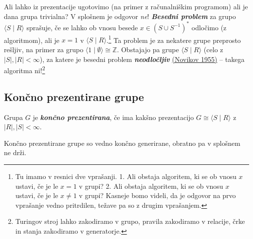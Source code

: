 \documentclass[11pt]{book}
\def\ZZ{\mathbb{Z}}
\def\definicija{\color{rdeca}\bf\em}
\def\vprasanje{\color{oranzna}}
\theoremstyle{definition}
\theoremstyle{zgled}
\theoremstyle{odprtproblem}
\theoremstyle{domacanaloga}
\theoremstyle{izrek}
\begin{document}
{\vprasanje Ali lahko iz prezentacije ugotovimo (na primer z računalniškim programom) ali je dana grupa trivialna?} V splošnem je odgovor {\em ne}! {\definicija Besedni problem} za grupo $\langle S \mid R \rangle$ sprašuje, če se lahko ob vnosu besede $x \in (S \cup S^{-1})^*$ odločimo (z algoritmom), ali je $x = 1$ v $\langle S \mid R \rangle$.\footnote{Tu imamo v resnici dve vprašanji. 1. Ali obstaja algoritem, ki se ob vnosu $x$ ustavi, če je le $x = 1$ v grupi? 2. Ali obstaja algoritem, ki se ob vnosu $x$ ustavi, če je le $x \neq 1$ v grupi? Kasneje bomo videli, da je odgovor na prvo vprašanje vedno pritrdilen, težave pa so z drugim vprašanjem.} Ta problem je za nekatere grupe preprosto rešljiv, na primer za grupo $\langle 1 \mid \emptyset \rangle \cong \ZZ$. Obstajajo pa grupe $\langle S \mid R \rangle$ (celo z $|S|, |R| < \infty$), za katere je besedni problem {\definicija neodločljiv} \href{http://www.mathnet.ru/php/archive.phtml?wshow=paper&jrnid=tm&paperid=1180&option_lang=eng}{(Novikov 1955)} -- takega algoritma ni!\footnote{Turingov stroj lahko zakodiramo v grupo, pravila zakodiramo v relacije, črke in stanja zakodiramo v generatorje.} 

\subsection{Končno prezentirane grupe}

Grupa $G$ je {\definicija končno prezentirana}, če ima kakšno prezentacijo $G \cong \langle S \mid R \rangle$ z $|R|, |S| < \infty$.

Končno prezentirane grupe so vedno končno generirane, obratno pa v splošnem ne drži.
\end{document}
